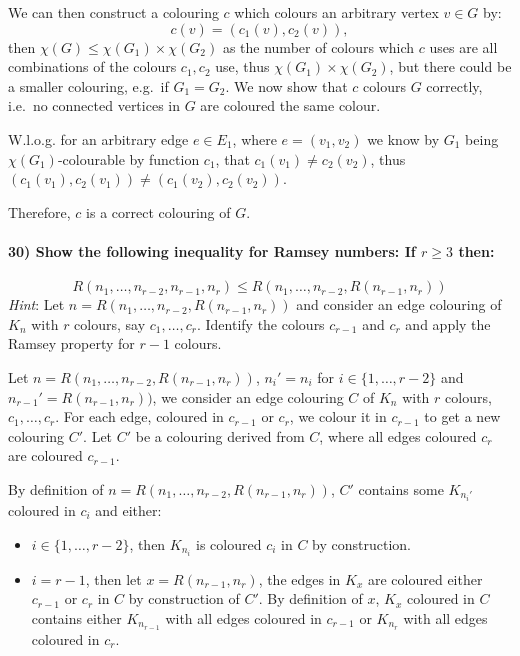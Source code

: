 \documentclass[
]{article}
\providecommand{\tightlist}{%
  \setlength{\itemsep}{0pt}\setlength{\parskip}{0pt}}
\begin{document}
We can then construct a colouring \(c\) which colours an arbitrary
vertex \(v \in G\) by: \[
c(v) = (c_1(v), c_2(v)),
\] then \(\chi(G) \leq \chi(G_1) \times \chi(G_2)\) as the number of
colours which \(c\) uses are all combinations of the colours
\(c_1, c_2\) use, thus \(\chi(G_1) \times \chi(G_2)\), but there could
be a smaller colouring, e.g.~if \(G_1 = G_2\). We now show that \(c\)
colours \(G\) correctly, i.e.~no connected vertices in \(G\) are
coloured the same colour.

W.l.o.g. for an arbitrary edge \(e \in E_1\), where \(e = (v_1,v_2)\) we
know by \(G_1\) being \(\chi(G_1)\)-colourable by function \(c_1\), that
\(c_1(v_1) \neq c_2(v_2)\), thus
\((c_1(v_1), c_2(v_1)) \neq (c_1(v_2),c_2(v_2))\).

Therefore, \(c\) is a correct colouring of \(G\).

\hypertarget{show-the-following-inequality-for-ramsey-numbers-if-r-geq-3-then}{%
\paragraph{\texorpdfstring{30) Show the following inequality for Ramsey
numbers: If \(r \geq 3\)
then:}{30) Show the following inequality for Ramsey numbers: If r \textbackslash geq 3 then:}}\label{show-the-following-inequality-for-ramsey-numbers-if-r-geq-3-then}}

\[
R(n_1, \dots, n_{r-2}, n_{r-1}, n_r) \leq R(n_1, \dots, n_{r-2}, R(n_{r-1},n_r))
\] \emph{Hint}: Let \(n= R(n_1, \dots, n_{r-2}, R(n_{r-1}, n_r))\) and
consider an edge colouring of \(K_n\) with \(r\) colours, say
\(c_1, \dots, c_r\). Identify the colours \(c_{r-1}\) and \(c_r\) and
apply the Ramsey property for \(r-1\) colours.

Let \(n= R(n_1, \dots, n_{r-2}, R(n_{r-1}, n_r))\), \(n_i' = n_i\) for
\(i \in \{1, \dots, r-2\}\) and \(n_{r-1}' = R(n_{r-1},n_r))\), we
consider an edge colouring \(C\) of \(K_n\) with \(r\) colours,
\(c_1, \dots, c_r\). For each edge, coloured in \(c_{r-1}\) or \(c_r\),
we colour it in \(c_{r-1}\) to get a new colouring \(C'\). Let \(C'\) be
a colouring derived from \(C\), where all edges coloured \(c_r\) are
coloured \(c_{r-1}\).

By definition of \(n = R(n_1, \dots, n_{r-2}, R(n_{r-1},n_r))\), \(C'\)
contains some \(K_{n_{i}'}\) coloured in \(c_i\) and either:

\begin{itemize}
\tightlist
\item
  \(i \in \{1, \dots, r-2\}\), then \(K_{n_{i}}\) is coloured \(c_i\) in
  \(C\) by construction.
\item
  \(i = r-1\), then let \(x = R(n_{r-1}, n_r)\), the edges in \(K_x\)
  are coloured either \(c_{r-1}\) or \(c_r\) in \(C\) by construction of
  \(C'\). By definition of \(x\), \(K_x\) coloured in \(C\) contains
  either \(K_{n_{r-1}}\) with all edges coloured in \(c_{r-1}\) or
  \(K_{n_r}\) with all edges coloured in \(c_r\).
\end{itemize}
\end{document}
